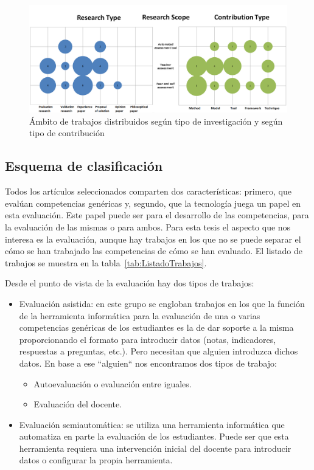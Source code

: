 \begin{landscape}
\pagestyle{empty}
\begin{figure}[h]
  \begin{center}
    \includegraphics[scale=0.4]{BurbujasMargin.png}
  \end{center}
  \caption{Ámbito de trabajos distribuidos según tipo de investigación y según tipo de contribución}
  \label{fig:Burble}
\end{figure}
\end{landscape}
\pagestyle{fancy}


\subsection{Esquema de clasificación}

Todos los artículos seleccionados comparten dos características: primero, que evalúan competencias genéricas y, segundo, que la tecnología juega un papel en esta evaluación. Este papel puede ser para el desarrollo de las competencias, para la evaluación de las mismas o para ambos. Para esta tesis el aspecto que nos interesa es la evaluación, aunque hay trabajos en los que no se puede separar el cómo se han trabajado las competencias de cómo se han evaluado. El listado de trabajos se muestra en la tabla~\ref{tab:ListadoTrabajos}.

Desde el punto de vista de la evaluación hay dos tipos de trabajos:
\begin{itemize}
\item Evaluación asistida: en este grupo se engloban trabajos en los que la función de la herramienta informática para la evaluación de una o varias competencias genéricas de los estudiantes es la de dar soporte a la misma proporcionando el formato para introducir datos (notas, indicadores, respuestas a preguntas, etc.). Pero necesitan que alguien introduzca dichos datos. En base a ese ``alguien`` nos encontramos dos tipos de trabajo:
	\begin{itemize}
		\item Autoevaluación o evaluación entre iguales.
		\item Evaluación del docente.
	\end{itemize}
\item Evaluación semiautomática: se utiliza una herramienta informática que automatiza en parte la evaluación de los estudiantes. Puede ser que esta herramienta requiera una intervención inicial del docente para introducir datos o configurar la propia herramienta.
\end{itemize}

